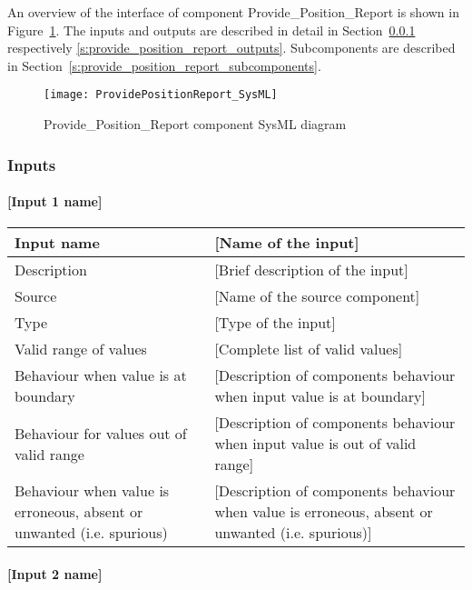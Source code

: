 An overview of the interface of component Provide\_Position\_Report is shown in Figure~\ref{f:provide_position_report_interface}. The inputs and outputs are described in detail in Section~\ref{s:provide_position_report_inputs} respectively \ref{s:provide_position_report_outputs}. Subcomponents are described in Section~\ref{s:provide_position_report_subcomponents}.

\begin{figure}
\center
\texttt{[image: ProvidePositionReport\_SysML]}
\caption{Provide\_Position\_Report component SysML diagram}\label{f:provide_position_report_interface}
\end{figure}


\subsubsection{Inputs}\label{s:provide_position_report_inputs}

\paragraph{[Input 1 name]}

\begin{longtable}{p{}p{}}
\toprule
Input name				& [Name of the input] \\
\midrule
Description				& [Brief description of the input] \\
\midrule
Source					& [Name of the source component] \\ 
\midrule
Type					& [Type of the input] \\
\midrule
Valid range of values	& [Complete list of valid values] \\
\midrule
Behaviour when value is at boundary	& [Description of components behaviour when input value is at boundary] \\
\midrule
Behaviour for values out of valid range	& [Description of components behaviour when input value is out of valid range] \\
\midrule
Behaviour when value is erroneous, absent or unwanted (i.e. spurious) & [Description of components behaviour when value is erroneous, absent or unwanted (i.e. spurious)] \\
\bottomrule
\end{longtable}


\paragraph{[Input 2 name]}

